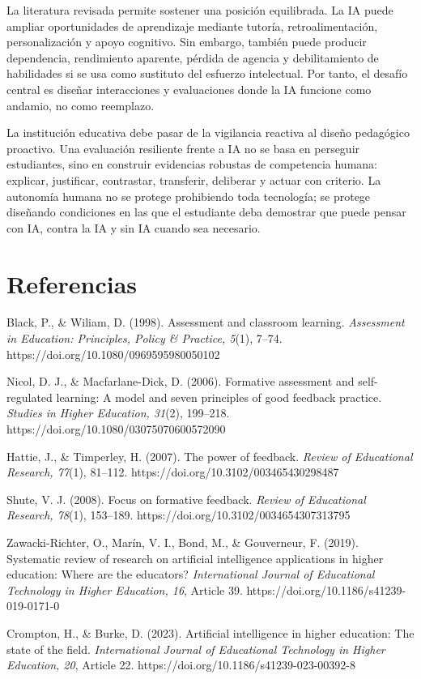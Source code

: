 \documentclass[
  spanish,
  letterpaper,
  DIV=11,
  numbers=noendperiod]{scrartcl}
\begin{document}
La literatura revisada permite sostener una posición equilibrada. La IA
puede ampliar oportunidades de aprendizaje mediante tutoría,
retroalimentación, personalización y apoyo cognitivo. Sin embargo,
también puede producir dependencia, rendimiento aparente, pérdida de
agencia y debilitamiento de habilidades si se usa como sustituto del
esfuerzo intelectual. Por tanto, el desafío central es diseñar
interacciones y evaluaciones donde la IA funcione como andamio, no como
reemplazo.

La institución educativa debe pasar de la vigilancia reactiva al diseño
pedagógico proactivo. Una evaluación resiliente frente a IA no se basa
en perseguir estudiantes, sino en construir evidencias robustas de
competencia humana: explicar, justificar, contrastar, transferir,
deliberar y actuar con criterio. La autonomía humana no se protege
prohibiendo toda tecnología; se protege diseñando condiciones en las que
el estudiante deba demostrar que puede pensar con IA, contra la IA y sin
IA cuando sea necesario.

\section{Referencias}\label{referencias}

Black, P., \& Wiliam, D. (1998). Assessment and classroom learning.
\emph{Assessment in Education: Principles, Policy \& Practice, 5}(1),
7--74. https://doi.org/10.1080/0969595980050102

Nicol, D. J., \& Macfarlane-Dick, D. (2006). Formative assessment and
self-regulated learning: A model and seven principles of good feedback
practice. \emph{Studies in Higher Education, 31}(2), 199--218.
https://doi.org/10.1080/03075070600572090

Hattie, J., \& Timperley, H. (2007). The power of feedback. \emph{Review
of Educational Research, 77}(1), 81--112.
https://doi.org/10.3102/003465430298487

Shute, V. J. (2008). Focus on formative feedback. \emph{Review of
Educational Research, 78}(1), 153--189.
https://doi.org/10.3102/0034654307313795

Zawacki-Richter, O., Marín, V. I., Bond, M., \& Gouverneur, F. (2019).
Systematic review of research on artificial intelligence applications in
higher education: Where are the educators? \emph{International Journal
of Educational Technology in Higher Education, 16}, Article 39.
https://doi.org/10.1186/s41239-019-0171-0

Crompton, H., \& Burke, D. (2023). Artificial intelligence in higher
education: The state of the field. \emph{International Journal of
Educational Technology in Higher Education, 20}, Article 22.
https://doi.org/10.1186/s41239-023-00392-8
\end{document}
